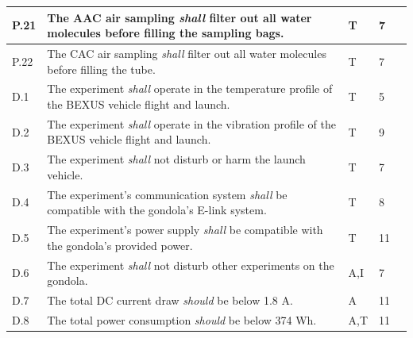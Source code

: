 \documentclass[a4paper,12pt,twoside]{article}
\begin{document}
\begin{longtable}[]{|m{}| m{} |m{} |m{}|m{}|}
                                                 \hline
P.21 & The AAC air sampling \textit{shall} filter out all water molecules before filling the sampling bags.                                                                             &        T      & 7            &        \\ \hline
P.22 & The CAC air sampling \textit{shall} filter out all water molecules before filling the tube.                                                                                      &         T     & 7            &        \\ \hline
D.1  & The experiment \textit{shall} operate in the temperature profile of the BEXUS vehicle flight and launch.                                                                         &       T       & 5            &        \\ \hline
D.2  & The experiment \textit{shall} operate in the vibration profile of the BEXUS vehicle flight and launch.                                                                           &       T       & 9            &        \\ \hline
D.3  & The experiment \textit{shall} not disturb or harm the launch vehicle.                                                                                                            &      T        & 7            &        \\ \hline
D.4  & The experiment's communication system \textit{shall} be compatible with the gondola's E-link system.                                                                             &      T        & 8            &        \\ \hline
D.5  & The experiment's power supply \textit{shall
} be compatible with the gondola's provided power.                                                                                    &      T        &  11           &        \\ \hline
D.6  & The experiment \textit{shall} not disturb other experiments on the gondola.                                                                                                      &       A,I       & 7            &        \\ \hline
D.7  & The total DC current draw \textit{should} be below 1.8 A.                                                                                                                        &      A        & 11            &        \\ \hline
D.8  & The total power consumption \textit{should} be below 374 Wh.                                                                                                                      &       A,T       & 11            &        \\ \hline

\end{longtable}
\end{document}
